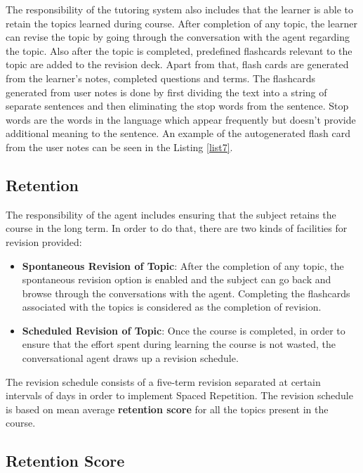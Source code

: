 \documentclass[]{article}
\begin{document}
The responsibility of the tutoring system also includes that the learner is able to retain the topics learned during course. After completion of any topic, the learner can revise the topic by going through the conversation with the agent regarding the topic. Also after the topic is completed, predefined flashcards relevant to the topic are added to the revision deck. Apart from that, flash cards are generated from the learner's notes, completed questions and terms. The flashcards generated from user notes is done by first dividing the text into a string of separate sentences and then eliminating the stop words from the sentence. Stop words are the words in the language which appear frequently but doesn't provide additional meaning to the sentence. An example of the autogenerated flash card from the user notes can be seen in the Listing \ref{list7}.

\subsection[Retention]{Retention}

The responsibility of the agent includes ensuring that the subject retains the course in the long term. In order to do that, there are two kinds of facilities for revision provided:
\begin{itemize}
  \item \textbf{Spontaneous Revision of Topic}: 
  After the completion of any topic, the spontaneous revision option is enabled and the subject can go back and browse through the conversations with the agent. Completing the flashcards associated with the topics is considered as the completion of revision.
  \item \textbf{Scheduled Revision of Topic}: 
  Once the course is completed,  in order to ensure that the effort spent during learning the course is not wasted, the conversational agent draws up a revision schedule. 
  
\end{itemize}


The revision schedule consists of a five-term revision separated at certain intervals of days in order to implement Spaced Repetition. The revision schedule is based on mean average \textbf{retention score} for all the topics present in the course. 


\subsection[Retention Score]{Retention Score}
\end{document}
